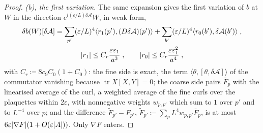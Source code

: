 \documentclass[11pt]{preprint}
\DeclarePairedDelimiter{\abs}{\lvert}{\rvert}
\numberwithin{equation}{section}
\theoremstyle{definition}
\theoremstyle{remark}
\theoremstyle{plain}
\begin{document}
\begin{proof}
\emph{(b), the first variation.} The same expansion gives the first variation of $b$ at $W$ in the direction $e^{i(\varepsilon/L)\delta\mathcal A}W$, in weak form,
\begin{equation}\label{eq:artefact-variation}
    \begin{gathered}
        \delta b(W)[\delta\mathcal A] = \sum_{p'}(\varepsilon/L)^4\langle r_1(p'), (D\delta\mathcal A)(p')\rangle + \sum_{b'}(\varepsilon/L)^4\langle r_0(b'), \delta\mathcal A(b')\rangle\;,
        \\
        \abs{r_1} \leq C_r\frac{\varepsilon\varepsilon_1}{a^3}\;,
        \qquad
        \abs{r_0} \leq C_r\frac{\varepsilon\varepsilon_1^2}{a^4}\;,
    \end{gathered}
\end{equation}
with $C_r \coloneqq 8c_9C_0(1 + C_0)$: the fine side is exact, the term $\langle\theta, [\theta, \delta\mathcal A]\rangle$ of the commutator vanishing because $\operatorname{tr}X[X, Y] = 0$; the coarse side pairs $\bar F_p$ with the linearised average of the curl, a weighted average of the fine curls over the plaquettes within $2\varepsilon$, with nonnegative weights $w_{p,p'}$ which sum to $1$ over $p'$ and to $L^{-4}$ over $p$; and the difference $\tilde F_{p'} - F_{p'}$, $\tilde F_{p'} \coloneqq \sum_pL^4w_{p,p'}\bar F_p$, is at most $6\varepsilon\abs{\nabla F}(1 + O(\varepsilon\abs A))$. Only $\nabla F$ enters.


\end{proof}
\end{document}
